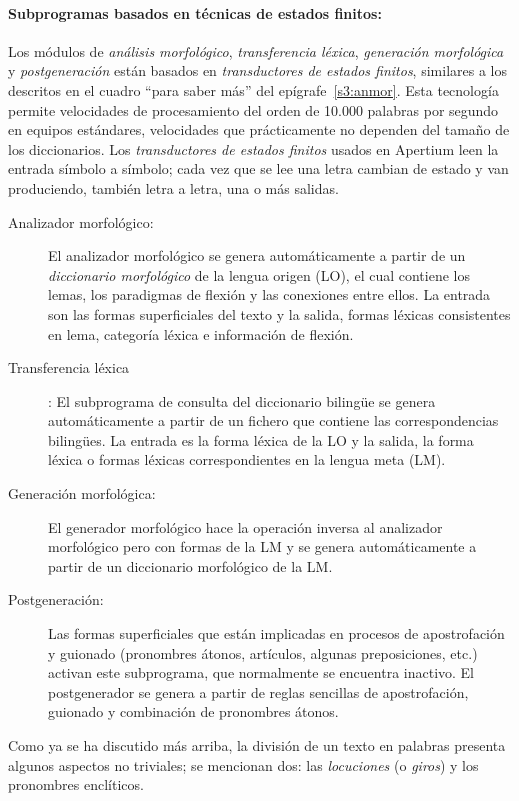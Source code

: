 \paragraph{Subprogramas basados en técnicas de estados finitos:} Los módulos de \emph{análisis morfológico}, \emph{transferencia léxica}, \emph{generación morfológica} y {\em postgeneración} están basados en \emph{transductores de estados finitos}, similares a los descritos en el cuadro ``para saber más'' del epígrafe~\ref{s3:anmor}. Esta tecnología permite velocidades de procesamiento del orden de 10.000 palabras por segundo en equipos estándares, velocidades que prácticamente no dependen del tamaño de los diccionarios. Los \emph{transductores de estados finitos} usados en Apertium leen la entrada símbolo a símbolo; cada vez que se lee una letra cambian de estado y van produciendo, también letra a letra, una o más salidas. \begin{description} \item[Analizador morfológico:] El analizador morfológico se genera automáticamente a partir de un \emph{diccionario morfológico} de la lengua origen (LO), el cual contiene los lemas, los paradigmas de flexión y las conexiones entre ellos. La entrada son las formas superficiales del texto y la salida, formas léxicas consistentes en lema, categoría léxica e información de flexión. \item[Transferencia léxica]: El subprograma de consulta del diccionario bilingüe se genera automáticamente a partir de un fichero que contiene las correspondencias bilingües. La entrada es la forma léxica de la LO y la salida, la forma léxica o formas léxicas correspondientes en la lengua meta (LM). \item[Generación morfológica:] El generador morfológico hace la operación inversa al analizador morfológico pero con formas de la LM y se genera automáticamente a partir de un diccionario morfológico de la LM. \item[Postgeneración:] Las formas superficiales que están implicadas en procesos de apostrofación y guionado (pronombres átonos, artículos, algunas preposiciones, etc.) activan este subprograma, que normalmente se encuentra inactivo. El postgenerador se genera a partir de reglas sencillas de apostrofación, guionado y combinación de pronombres átonos. \end{description} Como ya se ha discutido más arriba, la división de un texto en palabras presenta algunos aspectos no triviales; se mencionan dos: las \emph{locuciones} (o \emph{giros}) y los pronombres enclíticos. 

